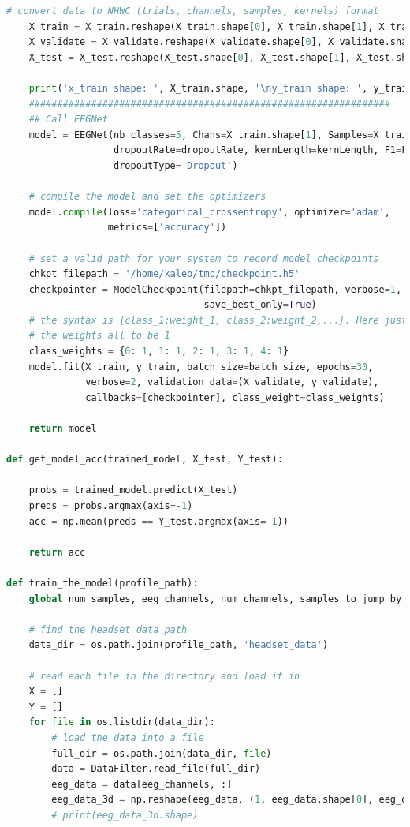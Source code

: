 \documentclass[conference]{IEEEtran}
\begin{document}
\begin{lstlisting}[language=Python, caption=Machine Learning Calls, label=ml_calls]
    # convert data to NHWC (trials, channels, samples, kernels) format
    X_train = X_train.reshape(X_train.shape[0], X_train.shape[1], X_train.shape[2], kernels)
    X_validate = X_validate.reshape(X_validate.shape[0], X_validate.shape[1], X_validate.shape[2], kernels)
    X_test = X_test.reshape(X_test.shape[0], X_test.shape[1], X_test.shape[2], kernels)

    print('x_train shape: ', X_train.shape, '\ny_train shape: ', y_train.shape)
    ################################################################
    ## Call EEGNet
    model = EEGNet(nb_classes=5, Chans=X_train.shape[1], Samples=X_train.shape[2],
                   dropoutRate=dropoutRate, kernLength=kernLength, F1=F1, D=D, F2=F2,
                   dropoutType='Dropout')

    # compile the model and set the optimizers
    model.compile(loss='categorical_crossentropy', optimizer='adam',
                  metrics=['accuracy'])

    # set a valid path for your system to record model checkpoints
    chkpt_filepath = '/home/kaleb/tmp/checkpoint.h5'
    checkpointer = ModelCheckpoint(filepath=chkpt_filepath, verbose=1,
                                   save_best_only=True)
    # the syntax is {class_1:weight_1, class_2:weight_2,...}. Here just setting
    # the weights all to be 1
    class_weights = {0: 1, 1: 1, 2: 1, 3: 1, 4: 1}
    model.fit(X_train, y_train, batch_size=batch_size, epochs=30,
              verbose=2, validation_data=(X_validate, y_validate),
              callbacks=[checkpointer], class_weight=class_weights)
    
    return model

def get_model_acc(trained_model, X_test, Y_test): 
    
    probs = trained_model.predict(X_test)
    preds = probs.argmax(axis=-1)
    acc = np.mean(preds == Y_test.argmax(axis=-1))
    
    return acc 

def train_the_model(profile_path): 
    global num_samples, eeg_channels, num_channels, samples_to_jump_by

    # find the headset data path
    data_dir = os.path.join(profile_path, 'headset_data')

    # read each file in the directory and load it in
    X = []
    Y = []
    for file in os.listdir(data_dir):
        # load the data into a file
        full_dir = os.path.join(data_dir, file)
        data = DataFilter.read_file(full_dir)
        eeg_data = data[eeg_channels, :]
        eeg_data_3d = np.reshape(eeg_data, (1, eeg_data.shape[0], eeg_data.shape[1]))
        # print(eeg_data_3d.shape)


\end{lstlisting}
\end{document}
